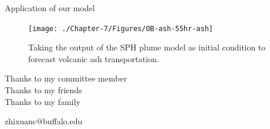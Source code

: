 \documentclass{beamer}
\begin{document}
\begin{frame}{Application of our model}
\begin{figure}[!htb]
\begin{minipage}{.295\textwidth}
    \end{minipage}%
    \begin{minipage}{.295\textwidth}
        \centering
        \texttt{[image: ./Chapter-7/Figures/OB-ash-55hr-ash]}
    \end{minipage}%
    \caption{Taking the output of the SPH plume model as initial condition to forecast volcanic ash transportation.}
    \label{fig:Plume-SPH-Pinatubo-SO2-cloud}
\end{figure}
\end{frame}


\begin{frame}{}
\center
\Large{
Thanks to my committee member \\
Thanks to my friends \\
Thanks to my family \\
}

\center
zhixuanc@buffalo.edu
\end{frame}


%
%    
%    
%
% 
%    
%
\end{document}
